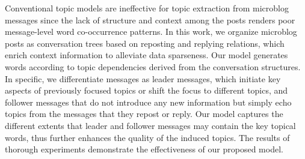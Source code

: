 Conventional topic models are ineffective for topic extraction from microblog messages since the lack of structure and context among the posts renders poor message-level word co-occurrence patterns. In this work, we organize microblog posts as conversation trees based on reposting and replying relations, which enrich context information to alleviate data sparseness. Our model generates words according to topic dependencies derived from the conversation structures. In specific, we differentiate messages as leader messages, which initiate key aspects of previously focused topics or shift the focus to different topics, and follower messages that do not introduce any new information but simply echo topics from the messages that they repost or reply. Our model captures the different extents that leader and follower messages may contain the key topical words, thus further enhances the quality of the induced topics. The results of thorough experiments demonstrate the effectiveness of our proposed model.
